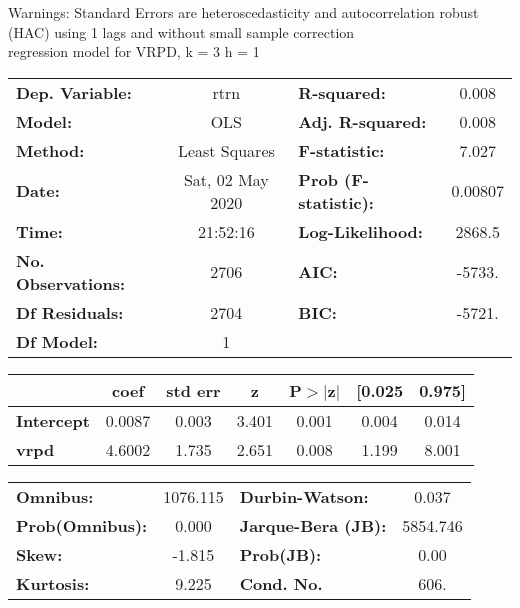 Warnings: \newline
 [1] Standard Errors are heteroscedasticity and autocorrelation robust (HAC) using 1 lags and without small sample correction\\ 

regression model for VRPD, k = 3 h = 1\begin{center}
\begin{tabular}{lclc}
\toprule
\textbf{Dep. Variable:}    &       rtrn       & \textbf{  R-squared:         } &     0.008   \\
\textbf{Model:}            &       OLS        & \textbf{  Adj. R-squared:    } &     0.008   \\
\textbf{Method:}           &  Least Squares   & \textbf{  F-statistic:       } &     7.027   \\
\textbf{Date:}             & Sat, 02 May 2020 & \textbf{  Prob (F-statistic):} &  0.00807    \\
\textbf{Time:}             &     21:52:16     & \textbf{  Log-Likelihood:    } &    2868.5   \\
\textbf{No. Observations:} &        2706      & \textbf{  AIC:               } &    -5733.   \\
\textbf{Df Residuals:}     &        2704      & \textbf{  BIC:               } &    -5721.   \\
\textbf{Df Model:}         &           1      & \textbf{                     } &             \\
\bottomrule
\end{tabular}
\begin{tabular}{lcccccc}
                   & \textbf{coef} & \textbf{std err} & \textbf{z} & \textbf{P$> |$z$|$} & \textbf{[0.025} & \textbf{0.975]}  \\
\midrule
\textbf{Intercept} &       0.0087  &        0.003     &     3.401  &         0.001        &        0.004    &        0.014     \\
\textbf{vrpd}      &       4.6002  &        1.735     &     2.651  &         0.008        &        1.199    &        8.001     \\
\bottomrule
\end{tabular}
\begin{tabular}{lclc}
\textbf{Omnibus:}       & 1076.115 & \textbf{  Durbin-Watson:     } &    0.037  \\
\textbf{Prob(Omnibus):} &   0.000  & \textbf{  Jarque-Bera (JB):  } & 5854.746  \\
\textbf{Skew:}          &  -1.815  & \textbf{  Prob(JB):          } &     0.00  \\
\textbf{Kurtosis:}      &   9.225  & \textbf{  Cond. No.          } &     606.  \\
\bottomrule
\end{tabular}
\end{center}

